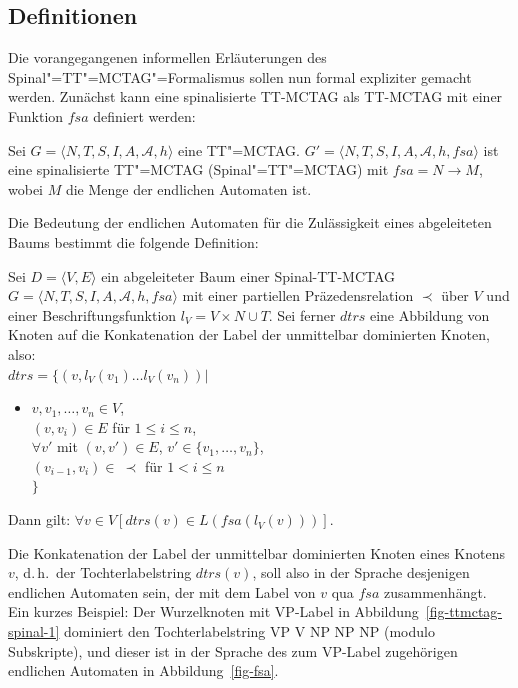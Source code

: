 \subsection{Definitionen}

Die vorangegangenen informellen Erläuterungen des Spinal"=TT"=MCTAG"=Formalismus sollen nun formal expliziter gemacht werden. Zunächst kann eine spinalisierte TT-MCTAG als TT-MCTAG mit einer Funktion $\mathit{fsa}$ definiert werden: 
\begin{definition}
Sei $G = \langle N,T,S,I,A,\mathcal{A},h\rangle$ eine TT"=MCTAG. $G' = \langle N,T,S,I,A,\mathcal{A},h,\mathit{fsa}\rangle$ ist eine spinalisierte TT"=MCTAG (Spinal"=TT"=MCTAG) mit $\mathit{fsa} = N \to M$, wobei $M$ die Menge der endlichen Automaten ist.
\end{definition}
Die Bedeutung der endlichen Automaten für die Zulässigkeit eines abgeleiteten Baums bestimmt die folgende Definition:
\begin{definition}
Sei $D = \langle V,E\rangle$ ein abgeleiteter Baum einer Spinal-TT-MCTAG $G = \langle N,T,S,I,A,\mathcal{A},h,\mathit{fsa}\rangle$ mit einer partiellen Präzedensrelation $\prec$ über $V$ und einer Beschriftungsfunktion $l_V = V \times N \cup T$. Sei ferner $\mathit{dtrs}$ eine Abbildung von Knoten auf die Konkatenation der Label der unmittelbar dominierten Knoten, also: \\[-1ex]

\noindent$\mathit{dtrs} = \{ (v, l_V(v_1)\ldots l_V(v_n)) |$ \\[-4ex]
\begin{itemize}
  \item[] $v, v_1, \ldots, v_n \in V$, \\
  $(v,v_i) \in E$ für $1 \leq i \leq n$, \\
  $\forall v'$ mit $(v,v') \in E$, $v' \in \{v_1, \ldots, v_n\}$, \\ 
  $(v_{i-1}, v_i) \in \ \prec$ für $1 < i \leq n$ \\[1.5ex] 
  $\}$	
\end{itemize}
Dann gilt: $\forall v \in V [ \mathit{dtrs}(v) \in L( \mathit{fsa}(l_V(v))) ]$.
\end{definition}
Die Konkatenation der Label der unmittelbar dominierten Knoten eines Knotens $v$, d.\,h.\ der Tochterlabelstring $\mathit{dtrs}(v)$, soll also in der Sprache desjenigen endlichen Automaten sein, der mit dem Label von $v$ qua $\mathit{fsa}$ zusammenhängt. Ein kurzes Beispiel: Der Wurzelknoten mit VP-Label in Abbildung~\ref{fig-ttmctag-spinal-1} dominiert den Tochterlabelstring VP V NP NP NP (modulo Subskripte), und dieser ist in der Sprache des zum VP-Label zugehörigen endlichen Automaten in Abbildung~\ref{fig-fsa}.

